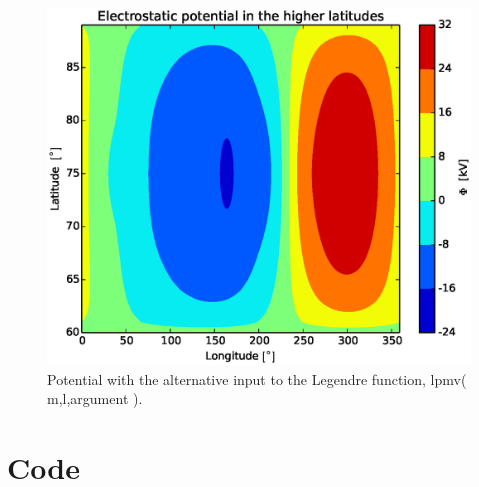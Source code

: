 \documentclass[x11names]{article}
\begin{document}
  \begin{figure}
    \centering
    \includegraphics[scale = 0.5]{../source/potential_wrong}
    \caption{Potential with the alternative input to the Legendre function, lpmv( m,l,argument ).}
    \label{fig:potential_wrong}
  \end{figure}

\section{Code}
  \label{sec:code}
  

      
\end{document}
